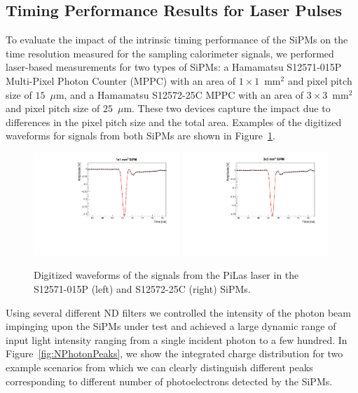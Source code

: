 \subsection{Timing Performance Results for Laser Pulses}
\label{sec:lasertiming}

To evaluate the impact of the intrinsic timing performance of the SiPMs
on the time resolution measured for the sampling calorimeter signals, 
we performed laser-based measurements for two types of SiPMs: a Hamamatsu
S12571-015P Multi-Pixel Photon Counter (MPPC) with an area of $1\times
1$~$\mathrm{mm}^{2}$ and pixel pitch size of $15$~$\mu$m, and a Hamamatsu
S12572-25C MPPC with an area of $3\times 3$~$\mathrm{mm}^{2}$ and pixel pitch
size of $25$~$\mu$m. These two devices capture the impact due to differences 
in the pixel pitch size and the total area. Examples of the digitized waveforms for signals from both
SiPMs are shown in Figure~\ref{fig:pulses}.

\begin{figure}[htbp] 
\centering
\includegraphics[width=0.49\textwidth]{figures/PulseShapeExample_1x1SiPM.pdf} 
\includegraphics[width=0.49\textwidth]{figures/PulseShapeExample_3x3SiPM.pdf} 
\caption{Digitized waveforms of the signals from the PiLas laser 
in the S12571-015P (left) and S12572-25C (right) SiPMs.} 
\label{fig:pulses} 
\end{figure} 

Using several different ND filters we controlled the intensity of the photon 
beam impinging upon the SiPMs under test and achieved a large dynamic range 
of input light intensity ranging from a single incident photon to a few hundred. In 
Figure~\ref{fig:NPhotonPeaks}, we show the integrated charge distribution
for two example scenarios from which we can clearly distinguish different peaks
corresponding to different number of photoelectrons detected by the SiPMs.

